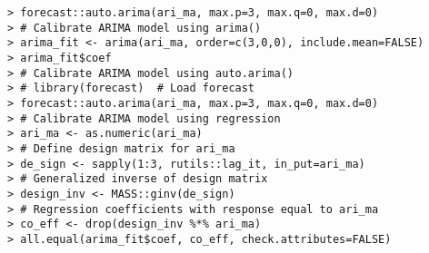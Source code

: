 \documentclass[10pt]{beamer}\usepackage[]{graphicx}\usepackage[]{color}
\makeatletter
\newenvironment{kframe}{%
 \def\at@end@of@kframe{}%
 \ifinner\ifhmode%
  \def\at@end@of@kframe{\end{minipage}}%
  \begin{minipage}{\columnwidth}%
 \fi\fi%
 \def\FrameCommand##1{\hskip\@totalleftmargin \hskip-\fboxsep
 \colorbox{shadecolor}{##1}\hskip-\fboxsep
     \hskip-\linewidth \hskip-\@totalleftmargin \hskip\columnwidth}%
 \MakeFramed {\advance\hsize-\width
   \@totalleftmargin\z@ \linewidth\hsize
   \@setminipage}}%
 {\par\unskip\endMakeFramed%
 \at@end@of@kframe}
\newenvironment{knitrout}{}{} %
\makeatother
\begin{document}
\begin{frame}[fragile,t]{\subsecname}
\begin{block}{}
\begin{columns}[T]
\begin{knitrout}
\begin{kframe}
\begin{verbatim}
> forecast::auto.arima(ari_ma, max.p=3, max.q=0, max.d=0)
> # Calibrate ARIMA model using arima()
> arima_fit <- arima(ari_ma, order=c(3,0,0), include.mean=FALSE)
> arima_fit$coef
> # Calibrate ARIMA model using auto.arima()
> # library(forecast)  # Load forecast
> forecast::auto.arima(ari_ma, max.p=3, max.q=0, max.d=0)
> # Calibrate ARIMA model using regression
> ari_ma <- as.numeric(ari_ma)
> # Define design matrix for ari_ma
> de_sign <- sapply(1:3, rutils::lag_it, in_put=ari_ma)
> # Generalized inverse of design matrix
> design_inv <- MASS::ginv(de_sign)
> # Regression coefficients with response equal to ari_ma
> co_eff <- drop(design_inv %*% ari_ma)
> all.equal(arima_fit$coef, co_eff, check.attributes=FALSE)
\end{verbatim}
\end{kframe}
\end{knitrout}
  \end{columns}
\end{block}

\end{frame}


\end{document}
